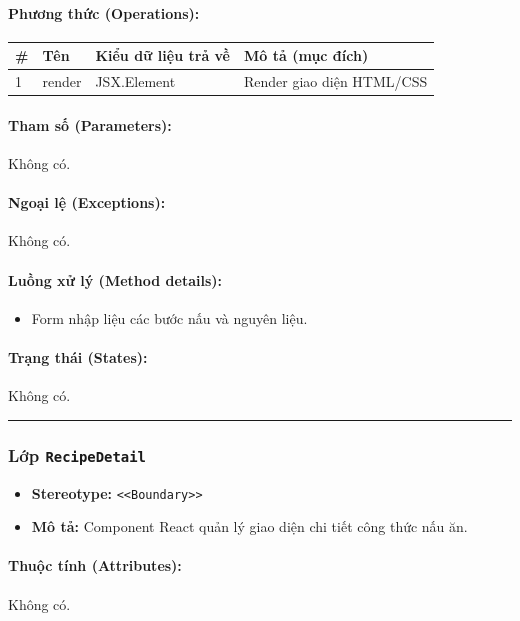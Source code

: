 \documentclass[12pt,a4paper]{article}
\begin{document}
\paragraph{Phương thức (Operations):}
\begin{longtable}{|p{0.6cm}|p{3.8cm}|p{2.6cm}|p{6.5cm}|}
\hline
\textbf{\#} & \textbf{Tên} & \textbf{Kiểu dữ liệu trả về} & \textbf{Mô tả (mục đích)} \\ \hline
\endhead
1 & render & JSX.Element & Render giao diện HTML/CSS \\ \hline
\end{longtable}

\paragraph{Tham số (Parameters):}
Không có.

\paragraph{Ngoại lệ (Exceptions):}
Không có.

\paragraph{Luồng xử lý (Method details):}
\begin{itemize}[leftmargin=*]
    \item Form nhập liệu các bước nấu và nguyên liệu.
\end{itemize}


\paragraph{Trạng thái (States):}
Không có.

\vskip 0.5cm
\noindent\rule{\textwidth}{0.5pt}
\vskip 0.5cm

\subsubsection{Lớp \texttt{RecipeDetail}}
\begin{itemize}[leftmargin=*]
    \item \textbf{Stereotype:} \texttt{\textless{}\textless{}Boundary\textgreater{}\textgreater{}}
    \item \textbf{Mô tả:} Component React quản lý giao diện chi tiết công thức nấu ăn.
\end{itemize}

\paragraph{Thuộc tính (Attributes):}
Không có.
\end{document}
